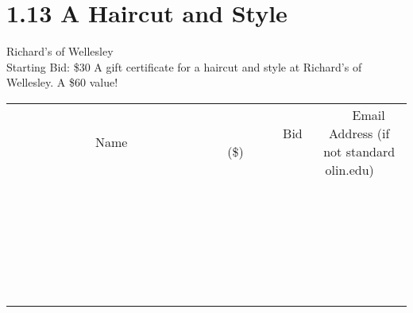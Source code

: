 \documentclass[11pt]{article}
\begin{document}
\section*{1.13 A Haircut and Style}
Richard's of Wellesley
\\
Starting Bid: \$30
\newline
A gift certificate for a haircut and style at Richard's of Wellesley. A \$60 value!
\\[6ex]
\begin{tabular}{c c c}
~~~~~~~~~~~~~Name~~~~~~~~~~~~~ & ~~~~~~~~~Bid (\$)~~~~~~~~~  & ~~~Email Address (if not standard olin.edu)~~~\\
 & & \\
\hline
 & & \\
\hline
 & & \\
\hline
 & & \\
\hline
 & & \\
\hline
 & & \\
\hline
 & & \\
\hline
 & & \\
\hline
 & & \\
\hline
 & & \\
\hline
 & & \\
\hline
 & & \\
\hline
 & & \\
\hline
 & & \\
\hline
 & & \\
\hline
 & & \\
\hline
 & & \\
\hline
 & & \\
\hline
 & & \\
\hline
 & & \\
\hline
 & & \\
\hline
 & & \\
\hline
 & & \\
\hline
 & & \\
\hline
 & & \\
\hline
 & & \\
\hline
\end{tabular}
\newpage
\end{document}
